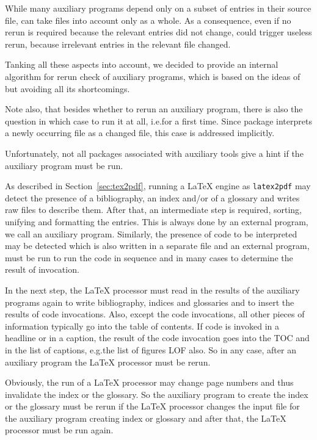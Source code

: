 While many auxiliary programs depend only on a subset of entries 
in their source file, 
 can take files into account only as a whole. 
As a consequence, even if no rerun is required 
because the relevant entries did not change, 
 could trigger useless rerun, 
because irrelevant entries in the relevant file changed. 

Tanking all these aspects into account, 
we decided to provide an internal algorithm for rerun check of auxiliary programs, 
which is based on the ideas of  
but avoiding all its shortcomings. 

Note also, that besides whether to rerun an auxiliary program, 
there is also the question in which case to run it at all, i.e.\@ for a first time. 
Since package  interprets a newly occurring file 
as a changed file, this case is addressed implicitly. 

Unfortunately, not all packages associated with auxiliary tools 
give a hint if the auxiliary program must be run. 
\medskip


As described in Section~\ref{sec:tex2pdf}, 
running a \LaTeX{} engine as \texttt{latex2pdf} 
may detect the presence of a bibliography, an index and/or of a glossary 
and writes raw files to describe them. 
After that, an intermediate step is required, 
sorting, unifying and formatting the entries. 
This is always done by an external program, we call an auxiliary program. 
Similarly, the presence of code to be interpreted 
may be detected which is also written in a separate file 
and an external program, 
 must be run to run the code in sequence 
and in many cases to determine the result of invocation. 

In the next step, 
the \LaTeX{} processor must read in the results of the auxiliary programs again 
to write bibliography, indices and glossaries 
and to insert the results of code invocations. 
Also, except the code invocations, 
all other pieces of information typically go into the table of contents. 
If code is invoked in a headline or in a caption, 
the result of the code invocation goes into the TOC and in the list of captions, 
e.g.\@ the list of figures LOF also. 
So in any case, after an auxiliary program the \LaTeX{} processor must be rerun. 

Obviously, the run of a \LaTeX{} processor may change page numbers 
and thus invalidate the index or the glossary. 
So the auxiliary program to create the index or the glossary must be rerun 
if the \LaTeX{} processor changes the input file for the auxiliary program 
creating index or glossary and after that, 
the \LaTeX{} processor must be run again. 

